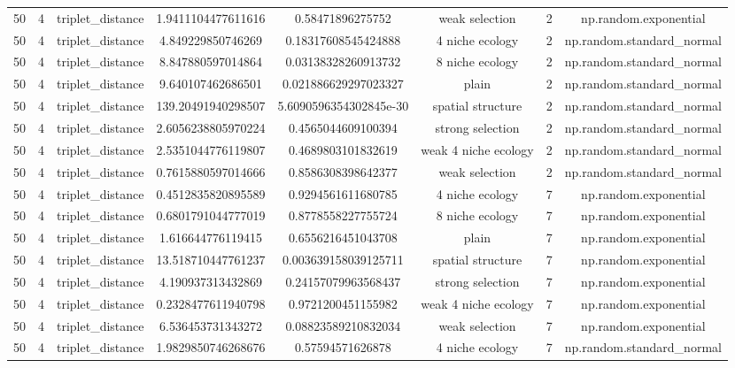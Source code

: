 \begin{longtable}{||c c c c c c c c||}
        50 & 4 & triplet\_distance & 1.9411104477611616 & 0.58471896275752 & weak selection & 2 & np.random.exponential \\ 
        50 & 4 & triplet\_distance & 4.849229850746269 & 0.18317608545424888 & 4 niche ecology & 2 & np.random.standard\_normal \\ 
        50 & 4 & triplet\_distance & 8.847880597014864 & 0.03138328260913732 & 8 niche ecology & 2 & np.random.standard\_normal \\ 
        50 & 4 & triplet\_distance & 9.640107462686501 & 0.021886629297023327 & plain & 2 & np.random.standard\_normal \\ 
        50 & 4 & triplet\_distance & 139.20491940298507 & 5.6090596354302845e-30 & spatial structure & 2 & np.random.standard\_normal \\ 
        50 & 4 & triplet\_distance & 2.6056238805970224 & 0.4565044609100394 & strong selection & 2 & np.random.standard\_normal \\ 
        50 & 4 & triplet\_distance & 2.5351044776119807 & 0.4689803101832619 & weak 4 niche ecology & 2 & np.random.standard\_normal \\ 
        50 & 4 & triplet\_distance & 0.7615880597014666 & 0.8586308398642377 & weak selection & 2 & np.random.standard\_normal \\ 
        50 & 4 & triplet\_distance & 0.4512835820895589 & 0.9294561611680785 & 4 niche ecology & 7 & np.random.exponential \\ 
        50 & 4 & triplet\_distance & 0.6801791044777019 & 0.8778558227755724 & 8 niche ecology & 7 & np.random.exponential \\ 
        50 & 4 & triplet\_distance & 1.616644776119415 & 0.6556216451043708 & plain & 7 & np.random.exponential \\ 
        50 & 4 & triplet\_distance & 13.518710447761237 & 0.003639158039125711 & spatial structure & 7 & np.random.exponential \\ 
        50 & 4 & triplet\_distance & 4.190937313432869 & 0.24157079963568437 & strong selection & 7 & np.random.exponential \\ 
        50 & 4 & triplet\_distance & 0.2328477611940798 & 0.9721200451155982 & weak 4 niche ecology & 7 & np.random.exponential \\ 
        50 & 4 & triplet\_distance & 6.536453731343272 & 0.08823589210832034 & weak selection & 7 & np.random.exponential \\ 
        50 & 4 & triplet\_distance & 1.9829850746268676 & 0.57594571626878 & 4 niche ecology & 7 & np.random.standard\_normal \\ 

\end{longtable}
